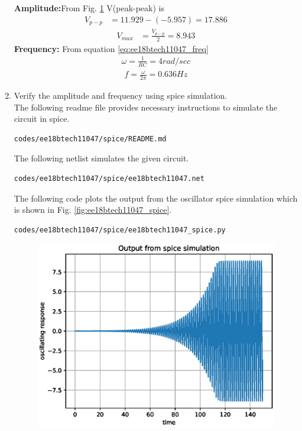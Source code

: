 \begin{enumerate}[label=\arabic*.,ref=\theenumi]
\begin{figure}[!ht]
\caption{}
\label{fig:ee18btech11047_fig8}
\end{figure}
\textbf{Amplitude:}From Fig. \ref{fig:ee18btech11047_fig8} V(peak-peak) is 
\begin{align}
V_{p-p} &= 11.929-(-5.957)= 17.886
\end{align}
\begin{align}
V_{max} &= \frac{V_{p-p}}{2} = 8.943
\end{align}
\textbf{Frequency:} From equation \eqref{eq:ee18btech11047_freq}
\begin{align}
\omega = \frac{1}{RC} = 4 rad/sec
\end{align}
\begin{align}
f = \frac{\omega }{2\pi} = 0.636 Hz
\end{align}
\item Verify the amplitude and frequency using spice simulation.\\
\solution The following readme file provides necessary instructions to simulate the circuit in spice.
\begin{lstlisting}
codes/ee18btech11047/spice/README.md
\end{lstlisting}
The following netlist simulates the given circuit.
\begin{lstlisting}
codes/ee18btech11047/spice/ee18btech11047.net
\end{lstlisting}
The following code plots the output from the oscillator spice simulation which is shown in Fig. \ref{fig:ee18btech11047_spice}.
\begin{lstlisting}
codes/ee18btech11047/spice/ee18btech11047_spice.py
\end{lstlisting}
\renewcommand{\thefigure}{\theenumi.\arabic{figure}}
%
\begin{figure}[!ht]
\centering
\includegraphics[width=\columnwidth]{./figs/ee18btech11047/ee18btech11047_spice.eps}

\end{figure}
\end{enumerate}
